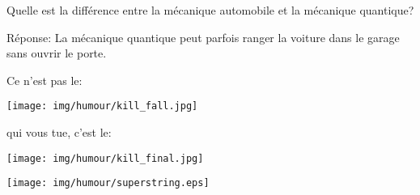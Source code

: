 	\begin{center}\underline{\hspace{5 cm}}\end{center}
	
	Quelle est la différence entre la mécanique automobile et la mécanique quantique?

	Réponse: La mécanique quantique peut parfois ranger la voiture dans le garage sans ouvrir le porte.
	
	\begin{center}\underline{\hspace{5 cm}}\end{center}
	
	\begin{center}
	Ce n'est pas le:
	
	\texttt{[image: img/humour/kill\_fall.jpg]}
	\end{center}
	
	\begin{center}
	qui vous tue, c'est le:
	\end{center}
	
	
	\begin{center}
	\texttt{[image: img/humour/kill\_final.jpg]}
	\end{center}

	\begin{center}
	\texttt{[image: img/humour/superstring.eps]}
	\end{center}
	
\begin{center}\underline{\hspace{5 cm}}\end{center}
	
